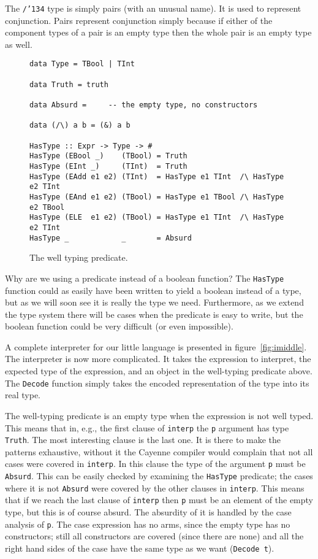 \documentclass{llncs}[12pt]             %
\newcommand\bs{\char '134}
\newcommand{\te}[1]{{\tt #1}}
\begin{document}
The \te{/\bs} type is simply pairs (with an unusual name).
It is used to represent conjunction.  Pairs represent conjunction
simply because if either of the component types of a pair is an
empty type then the whole pair is an empty type as well.

\begin{figure}
\begin{verbatim}
data Type = TBool | TInt

data Truth = truth

data Absurd =     -- the empty type, no constructors

data (/\) a b = (&) a b

HasType :: Expr -> Type -> #
HasType (EBool _)    (TBool) = Truth
HasType (EInt _)     (TInt)  = Truth
HasType (EAdd e1 e2) (TInt)  = HasType e1 TInt  /\ HasType e2 TInt
HasType (EAnd e1 e2) (TBool) = HasType e1 TBool /\ HasType e2 TBool
HasType (ELE  e1 e2) (TBool) = HasType e1 TInt  /\ HasType e2 TInt
HasType _            _       = Absurd
\end{verbatim}
\caption{The well typing predicate.}
\label{fig:mhastype}
\end{figure}

Why are we using a predicate instead of a boolean function?
The \te{HasType} function could as easily have been written to
yield a boolean instead of a type, but as we will soon see
it is really the type we need.  Furthermore, as we extend the
type system there will be cases when the predicate is easy
to write, but the boolean function could be very difficult
(or even impossible).

A complete interpreter for our little language is presented in
figure~\ref{fig:imiddle}.  The interpreter is now more complicated.
It takes the expression to interpret, the expected type of the
expression, and an object in the well-typing predicate above.
The \te{Decode} function simply takes the encoded representation
of the type into its real type.

The well-typing predicate is an empty type when the expression
is not well typed.  This means that in, e.g., the first clause
of \te{interp} the \te{p} argument has type \te{Truth}.
The most interesting clause is the last one.  It is there to make
the patterns exhaustive, without it the Cayenne compiler would
complain that not all cases were covered in \te{interp}.  In this
clause the type of the argument \te{p} must be \te{Absurd}.
This can be easily checked by examining the \te{HasType} predicate;
the cases where it is not \te{Absurd} were covered by the
other clauses in \te{interp}.  This means that if we reach the
last clause of \te{interp} then \te{p} must be an element of
the empty type, but this is of course absurd.  The absurdity
of it is handled by the case analysis of \te{p}.  The case expression
has no arms, since the empty type has no constructors; still
all constructors are covered (since there are none) and all the
right hand sides of the case have the same type as we want (\te{Decode t}).
\end{document}
